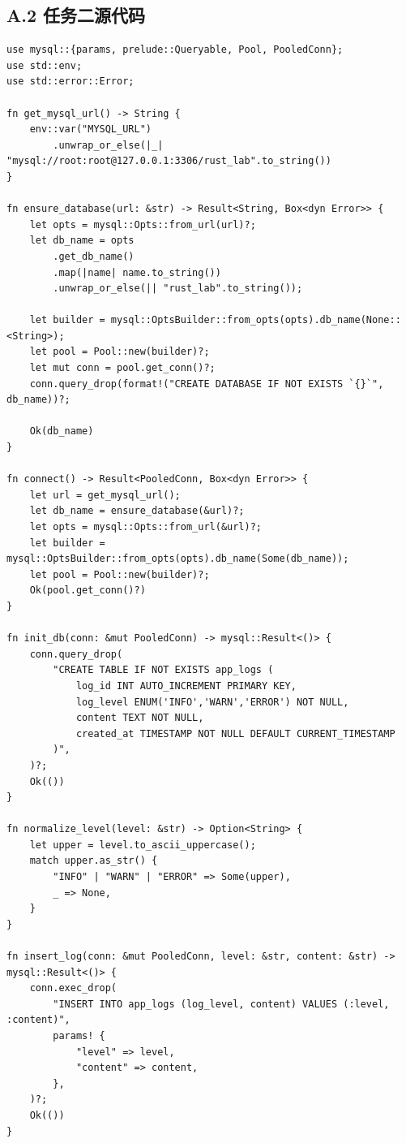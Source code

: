 \documentclass[12pt,a4paper]{ctexart}
\begin{document}
\subsection*{A.2 任务二源代码}
\begin{lstlisting}
use mysql::{params, prelude::Queryable, Pool, PooledConn};
use std::env;
use std::error::Error;

fn get_mysql_url() -> String {
    env::var("MYSQL_URL")
        .unwrap_or_else(|_| "mysql://root:root@127.0.0.1:3306/rust_lab".to_string())
}

fn ensure_database(url: &str) -> Result<String, Box<dyn Error>> {
    let opts = mysql::Opts::from_url(url)?;
    let db_name = opts
        .get_db_name()
        .map(|name| name.to_string())
        .unwrap_or_else(|| "rust_lab".to_string());

    let builder = mysql::OptsBuilder::from_opts(opts).db_name(None::<String>);
    let pool = Pool::new(builder)?;
    let mut conn = pool.get_conn()?;
    conn.query_drop(format!("CREATE DATABASE IF NOT EXISTS `{}`", db_name))?;

    Ok(db_name)
}

fn connect() -> Result<PooledConn, Box<dyn Error>> {
    let url = get_mysql_url();
    let db_name = ensure_database(&url)?;
    let opts = mysql::Opts::from_url(&url)?;
    let builder = mysql::OptsBuilder::from_opts(opts).db_name(Some(db_name));
    let pool = Pool::new(builder)?;
    Ok(pool.get_conn()?)
}

fn init_db(conn: &mut PooledConn) -> mysql::Result<()> {
    conn.query_drop(
        "CREATE TABLE IF NOT EXISTS app_logs (
            log_id INT AUTO_INCREMENT PRIMARY KEY,
            log_level ENUM('INFO','WARN','ERROR') NOT NULL,
            content TEXT NOT NULL,
            created_at TIMESTAMP NOT NULL DEFAULT CURRENT_TIMESTAMP
        )",
    )?;
    Ok(())
}

fn normalize_level(level: &str) -> Option<String> {
    let upper = level.to_ascii_uppercase();
    match upper.as_str() {
        "INFO" | "WARN" | "ERROR" => Some(upper),
        _ => None,
    }
}

fn insert_log(conn: &mut PooledConn, level: &str, content: &str) -> mysql::Result<()> {
    conn.exec_drop(
        "INSERT INTO app_logs (log_level, content) VALUES (:level, :content)",
        params! {
            "level" => level,
            "content" => content,
        },
    )?;
    Ok(())
}


\end{lstlisting}
\end{document}
